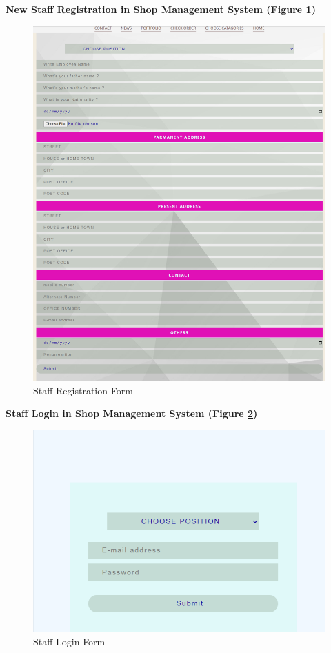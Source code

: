 \newpage
\textbf{New Staff Registration in Shop Management System (Figure \ref{fig:fig 6.2.16})}\\
\vspace{2cm}
\begin{figure}[ht]
    \centering  
    \includegraphics[width=\textwidth, height=0.7\textheight]{designs/staff-registration.png}    
    \caption{Staff Registration Form}
    \label{fig:fig 6.2.16}
\end{figure}

\newpage
\textbf{Staff Login in Shop Management System (Figure \ref{fig:fig 6.2.17})}\\

\begin{figure}[ht]
    \centering  
    \includegraphics[width=\textwidth, height=0.2\textheight, keepaspectratio]{designs/stafflogin.png}    
    \caption{Staff Login Form}
    \label{fig:fig 6.2.17}
\end{figure}

